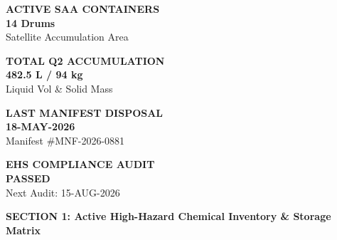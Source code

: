 \documentclass[10pt,a4paper]{article}
\begin{document}
\begin{tcolorbox}[
  enhanced,
  colback=SlateLight,
  colframe=SlateMid,
  arc=3pt,
  boxrule=0.5pt,
  top=4pt, bottom=4pt, left=6pt, right=6pt
]
  \begin{minipage}[t]{0.23\textwidth}
    \centering
    {\fontsize{6.5}{7.5}\selectfont\bfseries\color{TextMuted}ACTIVE SAA CONTAINERS}\\[1pt]
    {\fontsize{12}{14}\selectfont\bfseries\color{NavyPrimary}14 Drums}\\[1pt]
    {\tiny\color{TextMuted}Satellite Accumulation Area}
  \end{minipage}%
  \vline \hfill
  \begin{minipage}[t]{0.23\textwidth}
    \centering
    {\fontsize{6.5}{7.5}\selectfont\bfseries\color{TextMuted}TOTAL Q2 ACCUMULATION}\\[1pt]
    {\fontsize{12}{14}\selectfont\bfseries\color{AccentAmber}482.5 L / 94 kg}\\[1pt]
    {\tiny\color{TextMuted}Liquid Vol \& Solid Mass}
  \end{minipage}%
  \vline \hfill
  \begin{minipage}[t]{0.23\textwidth}
    \centering
    {\fontsize{6.5}{7.5}\selectfont\bfseries\color{TextMuted}LAST MANIFEST DISPOSAL}\\[1pt]
    {\fontsize{12}{14}\selectfont\bfseries\color{AccentTeal}18-MAY-2026}\\[1pt]
    {\tiny\color{TextMuted}Manifest \#MNF-2026-0881}
  \end{minipage}%
  \vline \hfill
  \begin{minipage}[t]{0.23\textwidth}
    \centering
    {\fontsize{6.5}{7.5}\selectfont\bfseries\color{TextMuted}EHS COMPLIANCE AUDIT}\\[1pt]
    {\fontsize{12}{14}\selectfont\bfseries\color{AccentTeal}PASSED}\\[1pt]
    {\tiny\color{TextMuted}Next Audit: 15-AUG-2026}
  \end{minipage}
\end{tcolorbox}

\vspace{1pt}

\begin{tcolorbox}[colback=NavyPrimary, colframe=NavyPrimary, arc=2pt, top=2.5pt, bottom=2.5pt, left=6pt]
  \color{white}\bfseries\small\faFlask\quad SECTION 1: Active High-Hazard Chemical Inventory \& Storage Matrix
\end{tcolorbox}
\end{document}

